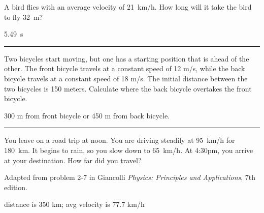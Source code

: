 \documentclass[12pt]{exam}
\begin{document}
\begin{questions}

\Large

\vfill 

\question A bird flies with an average velocity of 21~km/h.  How long will it take the bird to fly 32~m?

\begin{solution}
  5.49~s
\end{solution}

\vfill \hrule \vfill

\question Two bicycles start moving, but one has a starting position that is ahead of the other. The front bicycle travels at a constant speed of 12 m/s, while the back bicycle travels at a constant speed of 18 m/s. The initial distance between the two bicycles is 150 meters.  Calculate where the back bicycle overtakes the front bicycle.

\begin{solution}
  300 m from front bicycle or 450 m from back bicycle.
\end{solution}


\vfill \hrule \vfill

\question 
You leave on a road trip at noon.  You are driving steadily at 95~km/h for 180~km.  It begins to rain, so you slow down to 65~km/h.  At 4:30pm, you arrive at your destination.  How far did you travel?

{\small Adapted from problem 2-7 in Giancolli \emph{Physics: Principles and Applications}, 7th edition.}

\begin{solution}
  distance is 350 km; avg velocity is 77.7 km/h
\end{solution}

\vfill


\end{questions}
\end{document}
